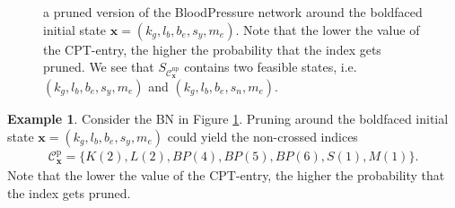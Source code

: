 \documentclass[a4paper, twoside, 11pt]{report}
\theoremstyle{plain}
\theoremstyle{definition}
\newtheorem{example}[thm]{Example}
\theoremstyle{remark}
\newcommand{\C}{{\mathcal C}}
\newcommand{\bfx}{{\mathbf{x}}}
\begin{document}
\begin{figure}[h!]
\begin{adjustbox}{width=\textwidth}
\end{adjustbox}
\caption{a pruned version of the BloodPressure network around the boldfaced initial state $\bfx = (k_g, l_b, b_e, s_y, m_e)$. Note that the lower the value of the CPT-entry, the higher the probability that the index gets pruned. We see that $S_{\C_\bfx^{\text{np}}}$ contains two feasible states, i.e. $(k_g, l_b, b_e, s_y, m_e)$ and $(k_g, l_b, b_e, s_n, m_e)$.}
\label{pruning}
\end{figure}

\begin{example}\label{ex:pruning}
Consider the BN in Figure \ref{pruning}. Pruning around the boldfaced initial state $\bfx = (k_g, l_b, b_e, s_y, m_e)$ could yield the non-crossed indices 
\begin{align*}
\C_\bfx^{\text{p}} = \{ K(2), L(2), BP(4), BP(5), BP(6), S(1), M(1) \}.
\end{align*}
Note that the lower the value of the CPT-entry, the higher the probability that the index gets pruned. 
\end{example}
\end{document}
